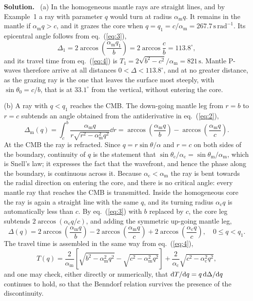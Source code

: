 \documentclass[a4paper,12pt]{paper}
\newenvironment{solution}{\par\noindent\textbf{Solution.}\ }{\par\medskip}
\begin{document}
\begin{solution}
(a) In the homogeneous mantle rays are straight lines, and by Example~1 a ray with parameter
$q$ would turn at radius $\alpha_{\mathrm{m}}q$. It remains in the mantle if
$\alpha_{\mathrm{m}}q>c$, and it grazes the core when $q=q_{1}=c/\alpha_{\mathrm{m}}
=267.7\,\mathrm{s\,rad^{-1}}$. Its epicentral angle follows from eq.~(\ref{eq:3}),
\begin{equation}
\Delta_{1}=2\arccos\left(\frac{\alpha_{\mathrm{m}}q_{1}}{b}\right)=2\arccos\frac{c}{b}=113.8^{\circ},
\label{eq:26}
\end{equation}
and its travel time from eq.~(\ref{eq:4}) is
$T_{1}=2\sqrt{b^{2}-c^{2}}/\alpha_{\mathrm{m}}=821\,\mathrm{s}$. Mantle P-waves therefore
arrive at all distances $0<\Delta<113.8^{\circ}$, and at no greater distance, as the grazing
ray is the one that leaves the surface most steeply, with $\sin\theta_{0}=c/b$, that is at
$33.1^{\circ}$ from the vertical, without entering the core.

(b) A ray with $q<q_{1}$ reaches the CMB. The down-going mantle leg from $r=b$ to $r=c$
subtends an angle obtained from the antiderivative in eq.~(\ref{eq:2}),
\begin{equation}
\Delta_{\mathrm{m}}(q)=\int_{c}^{b}\frac{\alpha_{\mathrm{m}}q}{r\sqrt{r^{2}-\alpha_{\mathrm{m}}^{2}q^{2}}}\dd r
=\arccos\left(\frac{\alpha_{\mathrm{m}}q}{b}\right)-\arccos\left(\frac{\alpha_{\mathrm{m}}q}{c}\right).
\label{eq:27}
\end{equation}
At the CMB the ray is refracted. Since $q=r\sin\theta/\alpha$ and $r=c$ on both sides of the
boundary, continuity of $q$ is the statement that
$\sin\theta_{\mathrm{c}}/\alpha_{\mathrm{c}}=\sin\theta_{\mathrm{m}}/\alpha_{\mathrm{m}}$, which
is Snell's law; it expresses the fact that the wavefront, and hence the phase along the
boundary, is continuous across it. Because $\alpha_{\mathrm{c}}<\alpha_{\mathrm{m}}$ the ray is
bent towards the radial direction on entering the core, and there is no critical angle: every
mantle ray that reaches the CMB is transmitted. Inside the homogeneous core the ray is again a
straight line with the same $q$, and its turning radius $\alpha_{\mathrm{c}}q$ is automatically
less than $c$. By eq.~(\ref{eq:3}) with $b$ replaced by $c$, the core leg subtends
$2\arccos(\alpha_{\mathrm{c}}q/c)$, and adding the symmetric up-going mantle leg,
\begin{equation}
\Delta(q)=2\arccos\left(\frac{\alpha_{\mathrm{m}}q}{b}\right)-2\arccos\left(\frac{\alpha_{\mathrm{m}}q}{c}\right)
+2\arccos\left(\frac{\alpha_{\mathrm{c}}q}{c}\right),\quad 0\le q<q_{1}.
\label{eq:28}
\end{equation}
The travel time is assembled in the same way from eq.~(\ref{eq:4}),
\begin{equation}
T(q)=\frac{2}{\alpha_{\mathrm{m}}}\left[\sqrt{b^{2}-\alpha_{\mathrm{m}}^{2}q^{2}}-\sqrt{c^{2}-\alpha_{\mathrm{m}}^{2}q^{2}}\right]
+\frac{2}{\alpha_{\mathrm{c}}}\sqrt{c^{2}-\alpha_{\mathrm{c}}^{2}q^{2}},
\label{eq:29}
\end{equation}
and one may check, either directly or numerically, that $\mathrm{d} T/\mathrm{d} q=q\,\mathrm{d}\Delta/\mathrm{d} q$
continues to hold, so that the Benndorf relation survives the presence of the discontinuity.


\end{solution}
\end{document}
